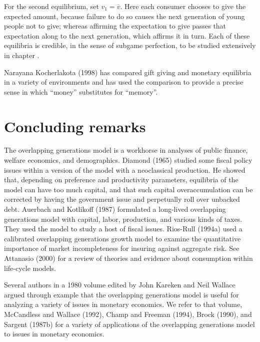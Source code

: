   For the second equilibrium, set $v_1 = \overline v$.   Here
each consumer chooses to give the expected amount, because
failure to do so causes  the next generation of
young people not to give; whereas affirming the expectation
to give passes that expectation along to the next generation,
which affirms it in turn.
Each of these equilibria is credible, in the sense
of subgame perfection, to be studied extensively in chapter
.


 Narayana Kocherlakota (1998) has  compared gift giving and monetary
equilibria in a variety of environments and has used the comparison to
provide a  precise sense in which ``money'' substitutes for ``memory''.

\section{Concluding remarks}
The overlapping generations model is a workhorse in
analyses of  public finance, welfare economics,
and demographics.  Diamond (1965) studied
some fiscal policy issues within a version of the model with a neoclassical production.
He showed that, depending on preference and productivity
parameters, equilibria of the model can
 have too much capital, and that such capital
overaccumulation can be corrected by having the government
issue and perpetually roll over unbacked debt.
Auerbach  and  Kotlikoff (1987)  formulated a long-lived overlapping
generations model with capital, labor, production, and
various kinds of taxes. They used the model to study
a host of fiscal issues. Rios-Rull (1994a) used a calibrated
overlapping generations growth model to examine
the quantitative importance of market incompleteness for
insuring against aggregate risk. See Attanasio (2000) for
a  review of theories and evidence
about consumption within life-cycle models.

Several authors in a 1980 volume edited by John Kareken
and Neil Wallace argued through example that the overlapping
generations model is useful for analyzing a variety of issues in
monetary economics.  We refer to that volume, McCandless
and Wallace (1992), Champ and Freeman (1994), Brock (1990),
and Sargent (1987b) for a variety of applications
of the overlapping generations model to issues in monetary
economics.


